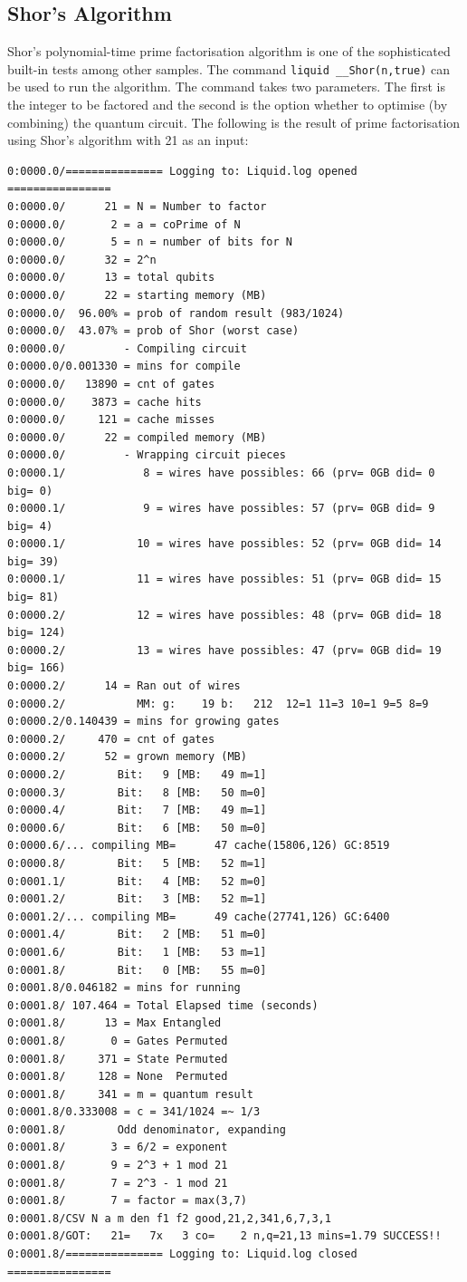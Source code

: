 \documentclass[12pt]{third-rep}
\begin{document}
\subsection{Shor's Algorithm}
Shor's polynomial-time prime factorisation algorithm is one of the sophisticated built-in tests among other samples. The command \texttt{liquid \_\_Shor(n,true)} can be used to run the algorithm. The command takes two parameters. The first is the integer to be factored and the second is the option whether to optimise (by combining) the quantum circuit. The following is the result of prime factorisation using Shor's algorithm with 21 as an input:
\begin{verbatim}
0:0000.0/=============== Logging to: Liquid.log opened ================
0:0000.0/      21 = N = Number to factor
0:0000.0/       2 = a = coPrime of N
0:0000.0/       5 = n = number of bits for N
0:0000.0/      32 = 2^n
0:0000.0/      13 = total qubits
0:0000.0/      22 = starting memory (MB)
0:0000.0/  96.00% = prob of random result (983/1024)
0:0000.0/  43.07% = prob of Shor (worst case)
0:0000.0/         - Compiling circuit
0:0000.0/0.001330 = mins for compile
0:0000.0/   13890 = cnt of gates
0:0000.0/    3873 = cache hits
0:0000.0/     121 = cache misses
0:0000.0/      22 = compiled memory (MB)
0:0000.0/         - Wrapping circuit pieces
0:0000.1/            8 = wires have possibles: 66 (prv= 0GB did= 0 big= 0)
0:0000.1/            9 = wires have possibles: 57 (prv= 0GB did= 9 big= 4)
0:0000.1/           10 = wires have possibles: 52 (prv= 0GB did= 14 big= 39)
0:0000.1/           11 = wires have possibles: 51 (prv= 0GB did= 15 big= 81)
0:0000.2/           12 = wires have possibles: 48 (prv= 0GB did= 18 big= 124)
0:0000.2/           13 = wires have possibles: 47 (prv= 0GB did= 19 big= 166)
0:0000.2/      14 = Ran out of wires
0:0000.2/           MM: g:    19 b:   212  12=1 11=3 10=1 9=5 8=9
0:0000.2/0.140439 = mins for growing gates
0:0000.2/     470 = cnt of gates
0:0000.2/      52 = grown memory (MB)
0:0000.2/        Bit:   9 [MB:   49 m=1]
0:0000.3/        Bit:   8 [MB:   50 m=0]
0:0000.4/        Bit:   7 [MB:   49 m=1]
0:0000.6/        Bit:   6 [MB:   50 m=0]
0:0000.6/... compiling MB=      47 cache(15806,126) GC:8519
0:0000.8/        Bit:   5 [MB:   52 m=1]
0:0001.1/        Bit:   4 [MB:   52 m=0]
0:0001.2/        Bit:   3 [MB:   52 m=1]
0:0001.2/... compiling MB=      49 cache(27741,126) GC:6400
0:0001.4/        Bit:   2 [MB:   51 m=0]
0:0001.6/        Bit:   1 [MB:   53 m=1]
0:0001.8/        Bit:   0 [MB:   55 m=0]
0:0001.8/0.046182 = mins for running
0:0001.8/ 107.464 = Total Elapsed time (seconds)
0:0001.8/      13 = Max Entangled
0:0001.8/       0 = Gates Permuted
0:0001.8/     371 = State Permuted
0:0001.8/     128 = None  Permuted
0:0001.8/     341 = m = quantum result
0:0001.8/0.333008 = c = 341/1024 =~ 1/3
0:0001.8/        Odd denominator, expanding
0:0001.8/       3 = 6/2 = exponent
0:0001.8/       9 = 2^3 + 1 mod 21
0:0001.8/       7 = 2^3 - 1 mod 21
0:0001.8/       7 = factor = max(3,7)
0:0001.8/CSV N a m den f1 f2 good,21,2,341,6,7,3,1
0:0001.8/GOT:   21=   7x   3 co=    2 n,q=21,13 mins=1.79 SUCCESS!!
0:0001.8/=============== Logging to: Liquid.log closed ================
\end{verbatim}
\end{document}
